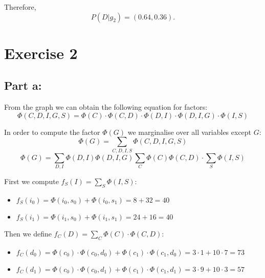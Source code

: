 \documentclass[11pt,a4paper]{article}
\begin{document}
	Therefore, $$P(D | g_2) = (0.64, 0.36).$$
	
	\newpage
	\section*{Exercise 2}
	\subsection*{Part a:}
	From the graph we can obtain the following equation for factors:
	$$\Phi(C,D,I,G,S) = \Phi(C) \cdot \Phi(C,D) \cdot \Phi(D,I) \cdot \Phi(D,I,G) \cdot \Phi(I,S)$$
	
	In order to compute the factor $\Phi(G)$ we marginalise over all variables except $G$:
	$$\Phi(G) = \sum_{C,D,I,S}\Phi(C,D,I,G,S)$$
	$$  \Phi(G)= \sum_{D, I} \Phi(D,I) \Phi(D,I,G)  \sum_{C}\Phi(C) \Phi(C,D) \cdot \sum_{S} \Phi(I,S)$$
	
	First we compute  $ f_S(I) = \sum_{S}\Phi(I,S):$
	\begin{itemize}
		\item $ f_S(i_0) = \Phi(i_0,s_0) + \Phi(i_0,s_1) = 8+32 = 40 $
		\item $ f_S(i_1) = \Phi(i_1,s_0) + \Phi(i_1,s_1) = 24+16 = 40 $
	\end{itemize}
	
	Then we define $f_C(D) = \sum_{C}\Phi(C) \cdot \Phi(C,D):$
	\begin{itemize}
		\item $ f_C(d_0) = \Phi(c_0) \cdot \Phi(c_0,d_0) + \Phi(c_1) \cdot \Phi(c_1
		,d_0) = 3 \cdot 1 + 10 \cdot 7 = 73 $
		\item $ f_C(d_1) = \Phi(c_0) \cdot \Phi(c_0,d_1) + \Phi(c_1) \cdot \Phi(c_1
		,d_1) = 3 \cdot 9 + 10 \cdot 3 = 57 $
	\end{itemize}
	
\end{document}
